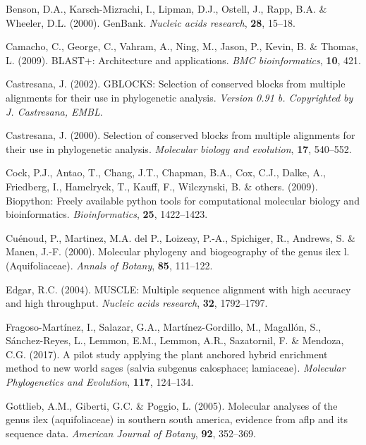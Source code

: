 \documentclass[]{article}
\begin{document}
\leavevmode\hypertarget{ref-benson2000genbank}{}%
Benson, D.A., Karsch-Mizrachi, I., Lipman, D.J., Ostell, J., Rapp, B.A. \& Wheeler, D.L. (2000). GenBank. \emph{Nucleic acids research}, \textbf{28}, 15--18.

\leavevmode\hypertarget{ref-camacho2009blast}{}%
Camacho, C., George, C., Vahram, A., Ning, M., Jason, P., Kevin, B. \& Thomas, L. (2009). BLAST+: Architecture and applications. \emph{BMC bioinformatics}, \textbf{10}, 421.

\leavevmode\hypertarget{ref-castresana2002gblocks}{}%
Castresana, J. (2002). GBLOCKS: Selection of conserved blocks from multiple alignments for their use in phylogenetic analysis. \emph{Version 0.91 b. Copyrighted by J. Castresana, EMBL}.

\leavevmode\hypertarget{ref-castresana2000selection}{}%
Castresana, J. (2000). Selection of conserved blocks from multiple alignments for their use in phylogenetic analysis. \emph{Molecular biology and evolution}, \textbf{17}, 540--552.

\leavevmode\hypertarget{ref-cock2009biopython}{}%
Cock, P.J., Antao, T., Chang, J.T., Chapman, B.A., Cox, C.J., Dalke, A., Friedberg, I., Hamelryck, T., Kauff, F., Wilczynski, B. \& others. (2009). Biopython: Freely available python tools for computational molecular biology and bioinformatics. \emph{Bioinformatics}, \textbf{25}, 1422--1423.

\leavevmode\hypertarget{ref-cuenoud2000molecular}{}%
Cuénoud, P., Martinez, M.A. del P., Loizeay, P.-A., Spichiger, R., Andrews, S. \& Manen, J.-F. (2000). Molecular phylogeny and biogeography of the genus ilex l.(Aquifoliaceae). \emph{Annals of Botany}, \textbf{85}, 111--122.

\leavevmode\hypertarget{ref-edgar2004muscle}{}%
Edgar, R.C. (2004). MUSCLE: Multiple sequence alignment with high accuracy and high throughput. \emph{Nucleic acids research}, \textbf{32}, 1792--1797.

\leavevmode\hypertarget{ref-fragoso2017pilot}{}%
Fragoso-Martínez, I., Salazar, G.A., Martínez-Gordillo, M., Magallón, S., Sánchez-Reyes, L., Lemmon, E.M., Lemmon, A.R., Sazatornil, F. \& Mendoza, C.G. (2017). A pilot study applying the plant anchored hybrid enrichment method to new world sages (salvia subgenus calosphace; lamiaceae). \emph{Molecular Phylogenetics and Evolution}, \textbf{117}, 124--134.

\leavevmode\hypertarget{ref-gottlieb2005molecular}{}%
Gottlieb, A.M., Giberti, G.C. \& Poggio, L. (2005). Molecular analyses of the genus ilex (aquifoliaceae) in southern south america, evidence from aflp and its sequence data. \emph{American Journal of Botany}, \textbf{92}, 352--369.
\end{document}
